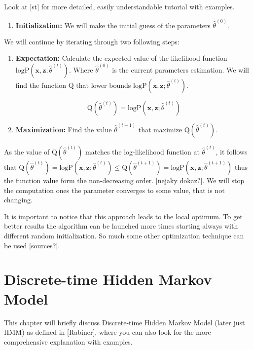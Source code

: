 \documentclass[thesis=M,english]{FITthesis}[2012/10/20]
\begin{document}
Look at [st] for more detailed, easily understandable tutorial with examples.    

\begin{enumerate}
\item \textbf{Initialization:} We will make the initial guess of the parameters $\hat \theta^{(0)} $.
\end{enumerate} 

We will continue by iterating through two following steps: 

\begin{enumerate}[resume]
\item \textbf{Expectation:} Calculate the expected value of the likelihood function $\mathrm{logP}(\mathbf{x},\mathbf{z};\hat \theta^{(t)})$. Where $\hat \theta^{(0)}$ is the current parameters estimation. We will find the function $\mathrm{Q}$ that lower bounds $\mathrm{logP}(\mathbf{x},\mathbf{z};\hat \theta^{(t)})$.

\begin{equation}\label{eq:exp}
 \mathrm{Q}(\hat\theta^{(t)}) =  \mathrm{logP}(\mathbf{x},\mathbf{z};\hat \theta^{(t)})
\end{equation}

\item \textbf{Maximization:} Find the value $\hat\theta^{(t+1)}$ that maximize $\mathrm{Q}(\hat\theta^{(t)})$.  
\end{enumerate}  

As the value of $\mathrm{Q}(\hat\theta^{(t)})$ matches the log-likelihood function at $\hat\theta^{(t)}$, it follows that $ \mathrm{Q}(\hat\theta^{(t)}) =  \mathrm{logP}(\mathbf{x},\mathbf{z};\hat \theta^{(t)}) \leq \mathrm{Q}(\hat\theta^{(t+1)}) =  \mathrm{logP}(\mathbf{x},\mathbf{z};\hat \theta^{(t+1)}) $ thus the function value form the non-decreasing order. [nejaky dokaz?]. We will stop the computation ones the parameter converges to some value, that is not changing.  

It is important to notice that this approach leads to the local optimum. To get better results the algorithm can be launched more times starting always with different random initialization. So much some other optimization technique can be used [sources?]. 



\chapter{Discrete-time Hidden Markov Model}
This chapter will briefly discuss Discrete-time Hidden Markov Model (later just HMM) as defined in [Rabiner], where you can also look for the more comprehensive explanation with examples.
\end{document}
